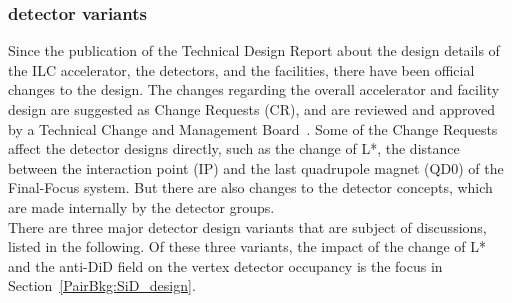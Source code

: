 \subsubsection{\sid detector variants}
\label{ILC:SiD:variants}
Since the publication of the Technical Design Report about the design details of the ILC accelerator, the detectors, and the facilities, there have been official changes to the design.
The changes regarding the overall accelerator and facility design are suggested as Change Requests (CR), and are reviewed and approved by a Technical Change and Management Board~\cite{TCMB}. 
Some of the Change Requests affect the detector designs directly, such as the change of L*, the distance between the interaction point (IP) and the last quadrupole magnet (QD0) of the Final-Focus system.
But there are also changes to the detector concepts, which are made internally by the detector groups.\\
There are three major \sid detector design variants that are subject of discussions, listed in the following.
Of these three variants, the impact of the change of L* and the anti-DiD field on the vertex detector occupancy is the focus in Section~\ref{PairBkg:SiD_design}.

